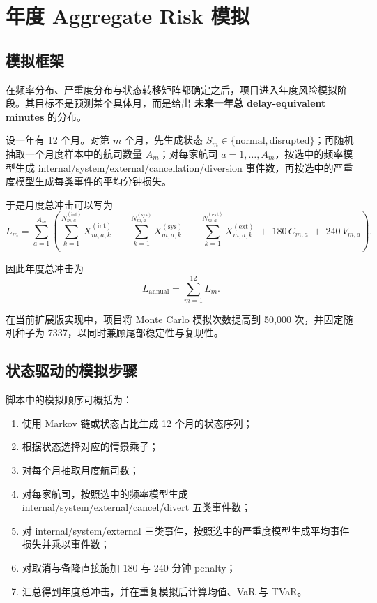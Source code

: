 \section{年度 Aggregate Risk 模拟}

\subsection{模拟框架}

在频率分布、严重度分布与状态转移矩阵都确定之后，项目进入年度风险模拟阶段。其目标不是预测某个具体月，而是给出 \textbf{未来一年总 delay-equivalent minutes} 的分布。

设一年有 12 个月。对第 $m$ 个月，先生成状态 $S_m \in \{\text{normal}, \text{disrupted}\}$；再随机抽取一个月度样本中的航司数量 $A_m$；对每家航司 $a=1,\dots,A_m$，按选中的频率模型生成 internal/system/external/cancellation/diversion 事件数，再按选中的严重度模型生成每类事件的平均分钟损失。

于是月度总冲击可以写为
\begin{equation}
L_m
=
\sum_{a=1}^{A_m}
\left(
\sum_{k=1}^{N_{m,a}^{(\text{int})}} X_{m,a,k}^{(\text{int})}
\;+\;
\sum_{k=1}^{N_{m,a}^{(\text{sys})}} X_{m,a,k}^{(\text{sys})}
\;+\;
\sum_{k=1}^{N_{m,a}^{(\text{ext})}} X_{m,a,k}^{(\text{ext})}
\;+\;
180\,C_{m,a}
\;+\;
240\,V_{m,a}
\right).
\end{equation}

因此年度总冲击为
\begin{equation}
L_{\text{annual}} = \sum_{m=1}^{12} L_m.
\end{equation}

在当前扩展版实现中，项目将 Monte Carlo 模拟次数提高到 50{,}000 次，并固定随机种子为 7337，以同时兼顾尾部稳定性与复现性。

\subsection{状态驱动的模拟步骤}

脚本中的模拟顺序可概括为：
\begin{enumerate}[leftmargin=2.2em]
  \item 使用 Markov 链或状态占比生成 12 个月的状态序列；
  \item 根据状态选择对应的情景乘子；
  \item 对每个月抽取月度航司数；
  \item 对每家航司，按照选中的频率模型生成 internal/system/external/cancel/divert 五类事件数；
  \item 对 internal/system/external 三类事件，按照选中的严重度模型生成平均事件损失并乘以事件数；
  \item 对取消与备降直接施加 180 与 240 分钟 penalty；
  \item 汇总得到年度总冲击，并在重复模拟后计算均值、VaR 与 TVaR。
\end{enumerate}

